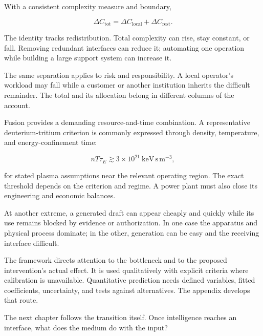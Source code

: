 
With a consistent complexity measure and boundary,

\begin{equation}
\Delta C_{\mathrm{tot}}=
\Delta C_{\mathrm{local}}+\Delta C_{\mathrm{rest}}.
\end{equation}

The identity tracks redistribution. Total complexity can rise, stay constant, or fall. Removing redundant interfaces can reduce it; automating one operation while building a large support system can increase it.

The same separation applies to risk and responsibility. A local operator's workload may fall while a customer or another institution inherits the difficult remainder. The total and its allocation belong in different columns of the account.


Fusion provides a demanding resource-and-time combination. A representative deuterium-tritium criterion is commonly expressed through density, temperature, and energy-confinement time:

\begin{equation}
nT\tau_E\gtrsim
3\times10^{21}\ \mathrm{keV\,s\,m^{-3}},
\end{equation}

for stated plasma assumptions near the relevant operating region.\cite{lawson1957some} The exact threshold depends on the criterion and regime. A power plant must also close its engineering and economic balances.

At another extreme, a generated draft can appear cheaply and quickly while its use remains blocked by evidence or authorization. In one case the apparatus and physical process dominate; in the other, generation can be easy and the receiving interface difficult.

The framework directs attention to the bottleneck and to the proposed intervention's actual effect. It is used qualitatively with explicit criteria where calibration is unavailable. Quantitative prediction needs defined variables, fitted coefficients, uncertainty, and tests against alternatives. The appendix develops that route.

The next chapter follows the transition itself. Once intelligence reaches an interface, what does the medium do with the input?
